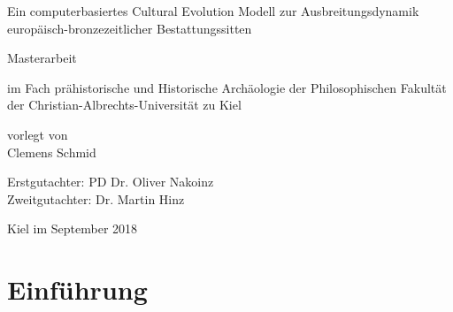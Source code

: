 \documentclass[openany,twoside,twocolumn]{book}
\title{}
\author{}
\date{}
\begin{document}
\begin{titlepage}

  \vspace*{\fill}

    \begin{center}

        \Huge Ein computerbasiertes Cultural Evolution Modell zur Ausbreitungsdynamik europäisch-bronzezeitlicher Bestattungssitten

        \vspace{2cm}

        \huge Masterarbeit

        \large im Fach prähistorische und Historische Archäologie der Philosophischen Fakultät der Christian-Albrechts-Universität zu Kiel

        \vspace{2cm}

        \large vorlegt von \\
        \huge Clemens Schmid

    \end{center}

\vspace{4cm}

\large Erstgutachter: PD Dr. Oliver Nakoinz \\
\large Zweitgutachter: Dr. Martin Hinz

\vspace{1cm}

\large Kiel im September 2018

  \vspace*{\fill}

\end{titlepage}

\renewcommand{\chaptermark}[1]{\markboth{#1}{}}
\renewcommand{\sectionmark}[1]{\markright{\thesection\ #1}}
\fancyhf{}
\fancyhead[LE,RO]{\textbf{\thepage}}
\fancyhead[LO]{\textbf{\nouppercase{\rightmark}}}
\fancyhead[RE]{\textbf{\nouppercase{\leftmark}}}

\setcounter{tocdepth}{3}
\tableofcontents
\listoftables
\listoffigures

\parskip 4pt \setlength{\textfloatsep}{10pt plus 1.0pt minus 2.0pt}

\AtEndDocument{
  
}

\hypertarget{intro}{%
\chapter{Einführung}\label{intro}}
\end{document}
